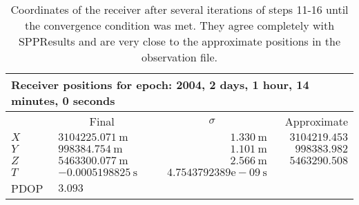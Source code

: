 \begin{table}[htbp]
	\begin{center}
		\begin{tabular}{llrr}
		\toprule
		\multicolumn{4}{l}{Receiver positions for epoch: 2004, 2 days, 1 hour, 14 minutes, 0 seconds} \\ \midrule
		& \multicolumn{1}{c}{Final} & \multicolumn{1}{c}{$\sigma$}  & \multicolumn{1}{r}{Approximate} \\
		\cmidrule(r){1-4} 
			$X$ & $ 3104225.071~\text{m}$	 & $1.330~\text{m}$						&$3104219.453$\\
			$Y$ & $ 998384.754~\text{m}$	 & $1.101~\text{m}$						&$998383.982$ \\
			$Z$ & $ 5463300.077~\text{m}$	 & $2.566~\text{m}$						&$5463290.508$\\
			$T$ & $ -0.0005198825~\text{s}$  & $4.7543792389\text{e}-09~\text{s}$	& 			  	\\
			PDOP & $3.093$ \\
		\bottomrule
		\end{tabular}
	\end{center}
	\caption{Coordinates of the receiver after several iterations of steps 11-16 until the convergence condition was met.  They agree completely with SPPResults and are very close to the approximate positions in the observation file.}
	\label{tab:receiverCoordinates}
\end{table}
